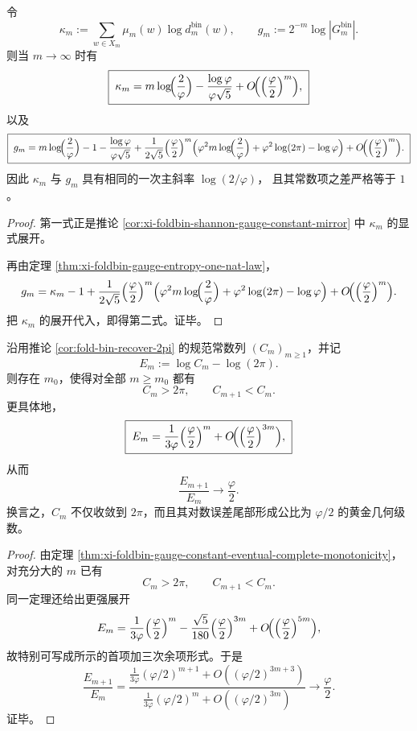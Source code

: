 \begin{theorem}[纤维信息项与规范体积密度的一次项显式化]\label{thm:xi-fold-kappa-gauge-first-order-constants}
令
\[
\kappa_m:=\sum_{w\in X_m}\mu_m(w)\log d_m^{\mathrm{bin}}(w),
\qquad
g_m:=2^{-m}\log |G_m^{\mathrm{bin}}|.
\]
则当 \(m\to\infty\) 时有
\[
\boxed{\;
\kappa_m
=
m\log\!\Bigl(\frac{2}{\varphi}\Bigr)
-\frac{\log\varphi}{\varphi\sqrt5}
+O\!\Bigl(\Bigl(\frac{\varphi}{2}\Bigr)^m\Bigr),\;}
\]
以及
\[
\boxed{\;
g_m
=
m\log\!\Bigl(\frac{2}{\varphi}\Bigr)
-1
-\frac{\log\varphi}{\varphi\sqrt5}
+\frac{1}{2\sqrt5}\Bigl(\frac{\varphi}{2}\Bigr)^m
\Bigl(
\varphi^2 m\log\!\Bigl(\frac{2}{\varphi}\Bigr)
+\varphi^2\log(2\pi)-\log\varphi
\Bigr)
+O\!\Bigl(\Bigl(\frac{\varphi}{2}\Bigr)^m\Bigr).\;}
\]
因此 \(\kappa_m\) 与 \(g_m\) 具有相同的一次主斜率
\(
\log(2/\varphi)
\)，
且其常数项之差严格等于 \(1\)。
\end{theorem}
\begin{proof}
第一式正是推论 \ref{cor:xi-foldbin-shannon-gauge-constant-mirror} 中
\(\kappa_m\) 的显式展开。

再由定理 \ref{thm:xi-foldbin-gauge-entropy-one-nat-law}，
\[
g_m
=
\kappa_m-1
+\frac{1}{2\sqrt5}\Bigl(\frac{\varphi}{2}\Bigr)^m
\Bigl(
\varphi^2 m\log\!\Bigl(\frac{2}{\varphi}\Bigr)
+\varphi^2\log(2\pi)-\log\varphi
\Bigr)
+O\!\Bigl(\Bigl(\frac{\varphi}{2}\Bigr)^m\Bigr).
\]
把 \(\kappa_m\) 的展开代入，即得第二式。证毕。
\end{proof}

\begin{theorem}\label{thm:xi-fold-gauge-2pi-estimator-geometric-lock}
沿用推论 \ref{cor:fold-bin-recover-2pi} 的规范常数列 \((C_m)_{m\ge 1}\)，并记
\[
E_m:=\log C_m-\log(2\pi).
\]
则存在 \(m_0\)，使得对全部 \(m\ge m_0\) 都有
\[
C_m>2\pi,
\qquad
C_{m+1}<C_m.
\]
更具体地，
\[
\boxed{\;
E_m
=
\frac{1}{3\varphi}\Bigl(\frac{\varphi}{2}\Bigr)^m
+O\!\Bigl(\Bigl(\frac{\varphi}{2}\Bigr)^{3m}\Bigr),\;}
\]
从而
\[
\boxed{\;
\frac{E_{m+1}}{E_m}
\longrightarrow
\frac{\varphi}{2}.\;}
\]
换言之，\(C_m\) 不仅收敛到 \(2\pi\)，而且其对数误差尾部形成公比为 \(\varphi/2\) 的黄金几何级数。
\end{theorem}
\begin{proof}
由定理 \ref{thm:xi-foldbin-gauge-constant-eventual-complete-monotonicity}，
对充分大的 \(m\) 已有
\[
C_m>2\pi,
\qquad
C_{m+1}<C_m.
\]
同一定理还给出更强展开
\[
E_m
=
\frac{1}{3\varphi}\Bigl(\frac{\varphi}{2}\Bigr)^m
-\frac{\sqrt5}{180}\Bigl(\frac{\varphi}{2}\Bigr)^{3m}
+O\!\Bigl(\Bigl(\frac{\varphi}{2}\Bigr)^{5m}\Bigr),
\]
故特别可写成所示的首项加三次余项形式。于是
\[
\frac{E_{m+1}}{E_m}
=
\frac{\frac{1}{3\varphi}(\varphi/2)^{m+1}+O((\varphi/2)^{3m+3})}
{\frac{1}{3\varphi}(\varphi/2)^m+O((\varphi/2)^{3m})}
\longrightarrow
\frac{\varphi}{2}.
\]
证毕。
\end{proof}

\endinput
